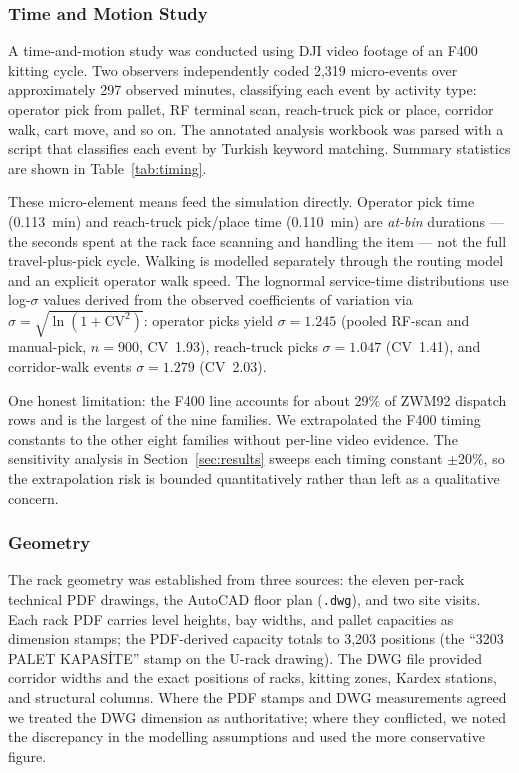 \subsubsection{Time and Motion Study}

A time-and-motion study was conducted using DJI video footage of an F400 kitting cycle. Two observers independently coded 2,319 micro-events over approximately 297 observed minutes, classifying each event by activity type: operator pick from pallet, RF terminal scan, reach-truck pick or place, corridor walk, cart move, and so on. The annotated analysis workbook was parsed with a script that classifies each event by Turkish keyword matching. Summary statistics are shown in Table~\ref{tab:timing}.



These micro-element means feed the simulation directly. Operator pick time (0.113~min) and reach-truck pick/place time (0.110~min) are \emph{at-bin} durations — the seconds spent at the rack face scanning and handling the item — not the full travel-plus-pick cycle. Walking is modelled separately through the routing model and an explicit operator walk speed. The lognormal service-time distributions use log-$\sigma$ values derived from the observed coefficients of variation via $\sigma = \sqrt{\ln(1 + \mathrm{CV}^2)}$: operator picks yield $\sigma = 1.245$ (pooled RF-scan and manual-pick, $n = 900$, CV~1.93), reach-truck picks $\sigma = 1.047$ (CV~1.41), and corridor-walk events $\sigma = 1.279$ (CV~2.03).

One honest limitation: the F400 line accounts for about 29\% of ZWM92 dispatch rows and is the largest of the nine families. We extrapolated the F400 timing constants to the other eight families without per-line video evidence. The sensitivity analysis in Section~\ref{sec:results} sweeps each timing constant $\pm$20\%, so the extrapolation risk is bounded quantitatively rather than left as a qualitative concern.

\subsubsection{Geometry}

The rack geometry was established from three sources: the eleven per-rack technical PDF drawings, the AutoCAD floor plan (\texttt{.dwg}), and two site visits. Each rack PDF carries level heights, bay widths, and pallet capacities as dimension stamps; the PDF-derived capacity totals to 3,203 positions (the ``3203 PALET KAPASİTE'' stamp on the U-rack drawing). The DWG file provided corridor widths and the exact positions of racks, kitting zones, Kardex stations, and structural columns. Where the PDF stamps and DWG measurements agreed we treated the DWG dimension as authoritative; where they conflicted, we noted the discrepancy in the modelling assumptions and used the more conservative figure.

